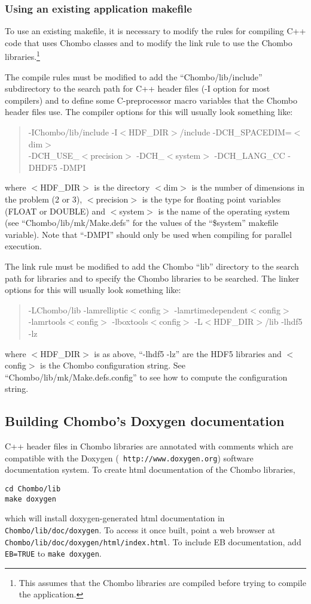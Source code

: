 \subsubsection{Using an existing application makefile}

To use an existing makefile, it is necessary to modify the rules for 
compiling C++ code that uses Chombo classes and to modify the link rule
to use the Chombo libraries.\footnote{This assumes that the Chombo libraries
are compiled before trying to compile the application.}

The compile rules must be modified to add the ``Chombo/lib/include''
subdirectory to the search path for C++ header files (-I option for most compilers)
and to define some C-preprocessor macro variables that the Chombo header files
use.  The compiler options for this will usually look something like:
\begin{quote}
  -IChombo/lib/include -I$<$HDF\_DIR$>$/include -DCH\_SPACEDIM=$<$dim$>$\\
  -DCH\_USE\_$<$precision$>$ -DCH\_$<$system$>$ -DCH\_LANG\_CC -DHDF5 -DMPI
\end{quote}

where $<$HDF\_DIR$>$ is the directory $<$dim$>$ is the number of dimensions in the problem (2 or 3),
$<$precision$>$ is the type for floating point variables (FLOAT or DOUBLE)
and $<$system$>$ is the name of the operating system (see ``Chombo/lib/mk/Make.defs''
for the values of the ``\$system'' makefile variable).  Note that ``-DMPI'' should
only be used when compiling for parallel execution.

The link rule must be modified to add the Chombo ``lib'' directory to the search 
path for libraries and to specify the Chombo libraries to be searched. 
The linker options for this will usually look something like:
\begin{quote}
  -LChombo/lib -lamrelliptic$<$config$>$ -lamrtimedependent$<$config$>$\\
  -lamrtools$<$config$>$ -lboxtools$<$config$>$ -L$<$HDF\_DIR$>$/lib -lhdf5 -lz
\end{quote}
where $<$HDF\_DIR$>$ is as above, ``-lhdf5 -lz'' are the HDF5 libraries and
$<$config$>$ is the Chombo configuration string.  See ``Chombo/lib/mk/Make.defs.config''
to see how to compute the configuration string.

\subsection{Building Chombo's Doxygen
  documentation \label{subsec:doxygen}}
C++ header files in Chombo libraries are annotated with
comments which are compatible with the Doxygen ({\tt
  http://www.doxygen.org}) software documentation system. To create
html documentation of the Chombo libraries, 
\begin{verbatim}
cd Chombo/lib
make doxygen
\end{verbatim}
which will install doxygen-generated html documentation in {\tt
  Chombo/lib/doc/doxygen}. To access it once built, point a web
browser at {\tt Chombo/lib/doc/doxygen/html/index.html}. 
To include EB documentation, add {\tt EB=TRUE} to {\tt make doxygen}. 

